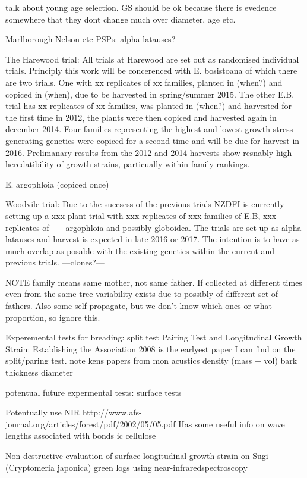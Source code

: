 \documentclass{article}
\begin{document}
talk about young age selection. GS should be ok because there is evedence
somewhere that they dont change much over diameter, age etc.

Marlborough Nelson etc PSPs:
alpha latauses?

The Harewood trial:
All trials at Harewood are set out as randomised individual trials.
Principly this work will be concerenced with E. bosistoana of which there are
two trials. One with xx replicates of xx families, planted in (when?) and
copiced in (when), due to be harvested in spring/summer 2015. The other E.B.
trial has xx replicates of xx families, was planted in (when?) and harvested for
the first time in 2012, the plants were then copiced and harvested again in
december 2014. Four families representing the highest and lowest growth stress
generating genetics were copiced for a second time and will be due for harvest
in 2016. Prelimanary results from the 2012 and 2014 harvests show resnably high
heredatibility of growth strains, particually within family rankings.

E. argophloia (copiced once)

Woodvile trial:
Due to the succsess of the previous trials NZDFI is currently setting up a xxx
plant trial with xxx replicates of xxx families of E.B, xxx replicates of ----
argophloia and possibly globoidea. The trials are set up as alpha latauses and
harvest is expected in late 2016 or 2017. The intention is to have as much
overlap as posable with the existing genetics within the current and previous
trials. ---clones?---

NOTE family means same mother, not same father.
If collected at different times even from the same tree variability exists due
to possibly of different set of fathers. Also some self propagate, but we don't
know which ones or what proportion, so ignore this.

Experemental tests for breading:
split test
Pairing Test and Longitudinal Growth Strain: Establishing the Association 2008
is the earlyest paper I can find on the split/paring test. note kens papers from
mon
acustics
density (mass + vol)
bark thickness
diameter

potentual future expermental tests:
surface tests

Potentually use NIR
http://www.afs-journal.org/articles/forest/pdf/2002/05/05.pdf
Has some useful info on wave lengths associated with bonds ic cellulose

Non-destructive evaluation of surface longitudinal growth strain
on Sugi (Cryptomeria japonica) green logs using near-infraredspectroscopy
\end{document}
